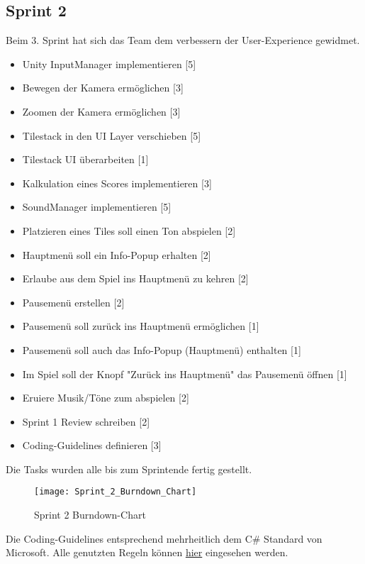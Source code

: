 \documentclass[../main.tex]{subfiles}
\begin{document}
	\subsection{Sprint 2}
	
	\par Beim 3. Sprint hat sich das Team dem verbessern der User-Experience gewidmet.
	
	\begin{itemize}
		\item Unity InputManager implementieren [5]
		\item Bewegen der Kamera ermöglichen [3]
		\item Zoomen der Kamera ermöglichen [3]
		\item Tilestack in den UI Layer verschieben [5]
		\item Tilestack UI überarbeiten [1]
		\item Kalkulation eines Scores implementieren [3]
		\item SoundManager implementieren [5]
		\item Platzieren eines Tiles soll einen Ton abspielen [2]
		\item Hauptmenü soll ein Info-Popup erhalten [2]
		\item Erlaube aus dem Spiel ins Hauptmenü zu kehren [2]
		\item Pausemenü erstellen [2]
		\item Pausemenü soll zurück ins Hauptmenü ermöglichen [1]
		\item Pausemenü soll auch das Info-Popup (Hauptmenü) enthalten [1]
		\item Im Spiel soll der Knopf "Zurück ins Hauptmenü" das Pausemenü öffnen [1]
		\item Eruiere Musik/Töne zum abspielen [2]
		\item Sprint 1 Review schreiben [2]
		\item Coding-Guidelines definieren [3]
		
	\end{itemize} 

	\par Die Tasks wurden alle bis zum Sprintende fertig gestellt.
	
	\begin{figure}[H]
		\centering
		\texttt{[image: Sprint\_2\_Burndown\_Chart]}
		\caption{Sprint 2 Burndown-Chart}
	\end{figure}

	\par Die Coding-Guidelines entsprechend mehrheitlich dem C\# Standard von Microsoft. Alle genutzten Regeln können \href{https://github.com/ktaranov/naming-convention/blob/master/C#Coding Standards and Naming Conventions.md}{hier} eingesehen werden.
\end{document}
